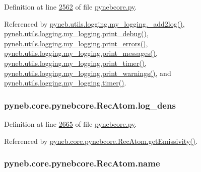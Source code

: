 Definition at line \hyperlink{pynebcore_8py_source_l02562}{2562} of file \hyperlink{pynebcore_8py_source}{pynebcore.\+py}.



Referenced by \hyperlink{logging_8py_source_l00059}{pyneb.\+utils.\+logging.\+my\+\_\+logging.\+\_\+add2log()}, \hyperlink{logging_8py_source_l00157}{pyneb.\+utils.\+logging.\+my\+\_\+logging.\+print\+\_\+debug()}, \hyperlink{logging_8py_source_l00149}{pyneb.\+utils.\+logging.\+my\+\_\+logging.\+print\+\_\+errors()}, \hyperlink{logging_8py_source_l00133}{pyneb.\+utils.\+logging.\+my\+\_\+logging.\+print\+\_\+messages()}, \hyperlink{logging_8py_source_l00165}{pyneb.\+utils.\+logging.\+my\+\_\+logging.\+print\+\_\+timer()}, \hyperlink{logging_8py_source_l00141}{pyneb.\+utils.\+logging.\+my\+\_\+logging.\+print\+\_\+warnings()}, and \hyperlink{logging_8py_source_l00115}{pyneb.\+utils.\+logging.\+my\+\_\+logging.\+timer()}.

\hypertarget{classpyneb_1_1core_1_1pynebcore_1_1_rec_atom_ac93e76934d279878d4f1f6d961df5488}{}
\subsubsection[{log\+\_\+dens}]{\setlength{\rightskip}{0pt plus 5cm}pyneb.\+core.\+pynebcore.\+Rec\+Atom.\+log\+\_\+dens}\label{classpyneb_1_1core_1_1pynebcore_1_1_rec_atom_ac93e76934d279878d4f1f6d961df5488}


Definition at line \hyperlink{pynebcore_8py_source_l02665}{2665} of file \hyperlink{pynebcore_8py_source}{pynebcore.\+py}.



Referenced by \hyperlink{pynebcore_8py_source_l02873}{pyneb.\+core.\+pynebcore.\+Rec\+Atom.\+get\+Emissivity()}.

\hypertarget{classpyneb_1_1core_1_1pynebcore_1_1_rec_atom_abde95b732830df56b3d7713313f83060}{}
\subsubsection[{name}]{\setlength{\rightskip}{0pt plus 5cm}pyneb.\+core.\+pynebcore.\+Rec\+Atom.\+name}\label{classpyneb_1_1core_1_1pynebcore_1_1_rec_atom_abde95b732830df56b3d7713313f83060}


